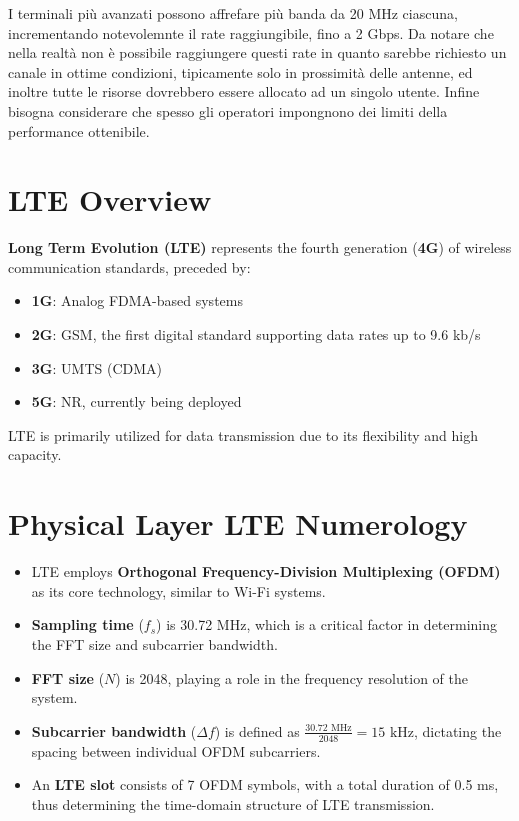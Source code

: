 I terminali più avanzati possono affrefare più banda da 20 MHz ciascuna, incrementando notevolemnte il rate raggiungibile, fino a 2 Gbps. Da notare che nella realtà non è possibile raggiungere questi rate in quanto sarebbe richiesto un canale in ottime condizioni, tipicamente solo in prossimità delle antenne, ed inoltre tutte le risorse dovrebbero essere allocato ad un singolo utente. Infine bisogna considerare che spesso gli operatori impongnono dei limiti della performance ottenibile.













\section*{LTE Overview}

\textbf{Long Term Evolution (LTE)} represents the fourth generation (\textbf{4G}) of wireless communication standards, preceded by:
\begin{itemize}
    \item \textbf{1G}: Analog FDMA-based systems
    \item \textbf{2G}: GSM, the first digital standard supporting data rates up to 9.6 kb/s
    \item \textbf{3G}: UMTS (CDMA)
    \item \textbf{5G}: NR, currently being deployed
\end{itemize}
LTE is primarily utilized for data transmission due to its flexibility and high capacity.

\section*{Physical Layer LTE Numerology}

\begin{itemize}
    \item LTE employs \textbf{Orthogonal Frequency-Division Multiplexing (OFDM)} as its core technology, similar to Wi-Fi systems.
    \item \textbf{Sampling time} (\(f_s\)) is 30.72 MHz, which is a critical factor in determining the FFT size and subcarrier bandwidth.
    \item \textbf{FFT size} (\(N\)) is 2048, playing a role in the frequency resolution of the system.
    \item \textbf{Subcarrier bandwidth} (\(\Delta f\)) is defined as \(\frac{30.72 \text{ MHz}}{2048} = 15 \text{ kHz}\), dictating the spacing between individual OFDM subcarriers.
    \item An \textbf{LTE slot} consists of 7 OFDM symbols, with a total duration of 0.5 ms, thus determining the time-domain structure of LTE transmission.
\end{itemize}

